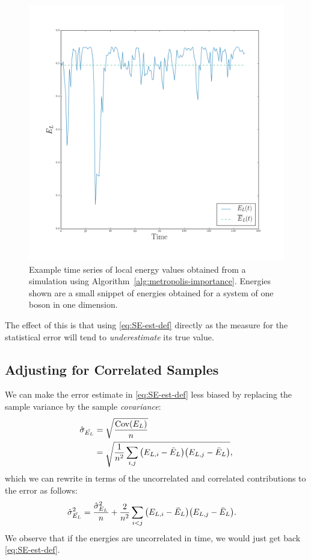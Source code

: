 \documentclass[twocolumn]{article}
\begin{document}
\begin{figure}[ht]
    \centering
    \includegraphics[width=0.8\linewidth]{../results/time-series-example.png}
    \caption{Example time series of local energy values obtained from a
    simulation using Algorithm~\ref{alg:metropolis-importance}. Energies shown
    are a small snippet of energies obtained for a system of one boson in one
    dimension.}
    \label{fig:time-series-example}
\end{figure}

The effect of this is that using \eqref{eq:SE-est-def} directly as the measure for
the statistical error will tend to \textit{underestimate} its true value.

\subsection{Adjusting for Correlated Samples}

We can make the error estimate in \eqref{eq:SE-est-def} less biased by replacing
the sample variance by the sample \textit{covariance}:
\begin{align}
    \begin{split}
        \hat{\sigma}_{\bar{ E_L}} &= \sqrt{\frac{\text{Cov}(E_L)}{n}}\\
        &= \sqrt{\frac{1}{n^2}\sum_{i,j}\qty(E_{L,i} - \bar{E}_L)\qty(E_{L,j}-\bar{E}_L)},
    \end{split}
    \label{eq:SE-est-covar-def}
\end{align}
which we can rewrite in terms of the uncorrelated and correlated contributions
to the error as follows:
\begin{align}
    \begin{split}
    \hat{\sigma}^2_{\bar{E_L}} &=
        \frac{\hat{\sigma}^2_{E_L}}{n}
    + \frac{2}{n^2}\sum_{i<j}\qty(E_{L,i} - \bar{E}_L)\qty(E_{L,j}-\bar{E}_L).
    \end{split}\label{eq:SE-est-covar-expanded}
\end{align}
We observe that if the energies are uncorrelated in time, we would just get back
\eqref{eq:SE-est-def}.
\end{document}
